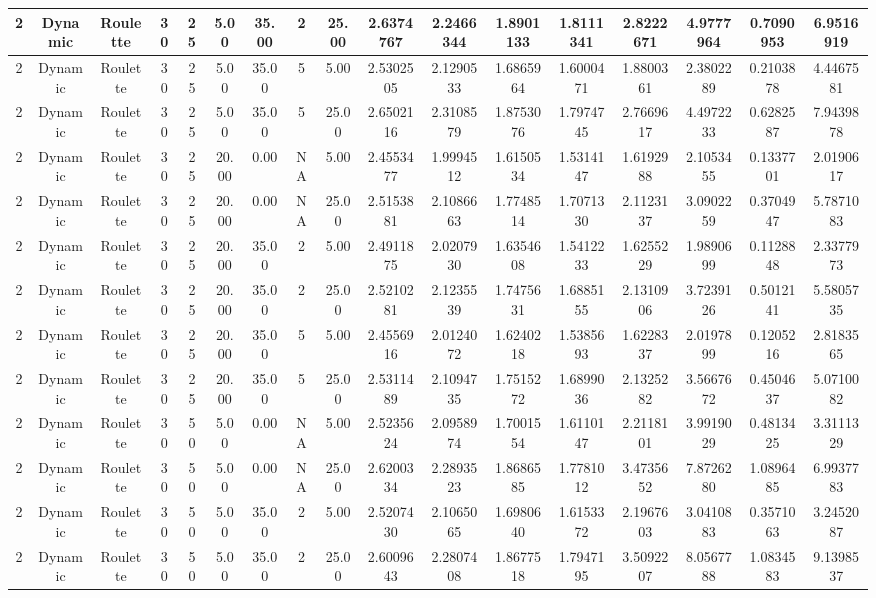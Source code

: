 \begin{longtable}{ | c | c | c | c | c | c | c | c | c | c | c | c | c | c | c | c | c | }
	\hline
	2	&	Dynamic	&	Roulette	&	30	&	25	&	5.00	&	35.00	&	2	&	25.00	&	2.6374767	&	2.2466344	&	1.8901133	&	1.8111341	&	2.8222671	&	4.9777964	&	0.7090953	&	6.9516919 \\
	\hline
	2	&	Dynamic	&	Roulette	&	30	&	25	&	5.00	&	35.00	&	5	&	5.00	&	2.5302505	&	2.1290533	&	1.6865964	&	1.6000471	&	1.8800361	&	2.3802289	&	0.2103878	&	4.4467581 \\
	\hline
	2	&	Dynamic	&	Roulette	&	30	&	25	&	5.00	&	35.00	&	5	&	25.00	&	2.6502116	&	2.3108579	&	1.8753076	&	1.7974745	&	2.7669617	&	4.4972233	&	0.6282587	&	7.9439878 \\
	\hline
	2	&	Dynamic	&	Roulette	&	30	&	25	&	20.00	&	0.00	&	NA	&	5.00	&	2.4553477	&	1.9994512	&	1.6150534	&	1.5314147	&	1.6192988	&	2.1053455	&	0.1337701	&	2.0190617 \\
	\hline
	2	&	Dynamic	&	Roulette	&	30	&	25	&	20.00	&	0.00	&	NA	&	25.00	&	2.5153881	&	2.1086663	&	1.7748514	&	1.7071330	&	2.1123137	&	3.0902259	&	0.3704947	&	5.7871083 \\
	\hline
	2	&	Dynamic	&	Roulette	&	30	&	25	&	20.00	&	35.00	&	2	&	5.00	&	2.4911875	&	2.0207930	&	1.6354608	&	1.5412233	&	1.6255229	&	1.9890699	&	0.1128848	&	2.3377973 \\
	\hline
	2	&	Dynamic	&	Roulette	&	30	&	25	&	20.00	&	35.00	&	2	&	25.00	&	2.5210281	&	2.1235539	&	1.7475631	&	1.6885155	&	2.1310906	&	3.7239126	&	0.5012141	&	5.5805735 \\
	\hline
	2	&	Dynamic	&	Roulette	&	30	&	25	&	20.00	&	35.00	&	5	&	5.00	&	2.4556916	&	2.0124072	&	1.6240218	&	1.5385693	&	1.6228337	&	2.0197899	&	0.1205216	&	2.8183565 \\
	\hline
	2	&	Dynamic	&	Roulette	&	30	&	25	&	20.00	&	35.00	&	5	&	25.00	&	2.5311489	&	2.1094735	&	1.7515272	&	1.6899036	&	2.1325282	&	3.5667672	&	0.4504637	&	5.0710082 \\
	\hline
	2	&	Dynamic	&	Roulette	&	30	&	50	&	5.00	&	0.00	&	NA	&	5.00	&	2.5235624	&	2.0958974	&	1.7001554	&	1.6110147	&	2.2118101	&	3.9919029	&	0.4813425	&	3.3111329 \\
	\hline
	2	&	Dynamic	&	Roulette	&	30	&	50	&	5.00	&	0.00	&	NA	&	25.00	&	2.6200334	&	2.2893523	&	1.8686585	&	1.7781012	&	3.4735652	&	7.8726280	&	1.0896485	&	6.9937783 \\
	\hline
	2	&	Dynamic	&	Roulette	&	30	&	50	&	5.00	&	35.00	&	2	&	5.00	&	2.5207430	&	2.1065065	&	1.6980640	&	1.6153372	&	2.1967603	&	3.0410883	&	0.3571063	&	3.2452087 \\
	\hline
	2	&	Dynamic	&	Roulette	&	30	&	50	&	5.00	&	35.00	&	2	&	25.00	&	2.6009643	&	2.2807408	&	1.8677518	&	1.7947195	&	3.5092207	&	8.0567788	&	1.0834583	&	9.1398537 \\

\end{longtable}
